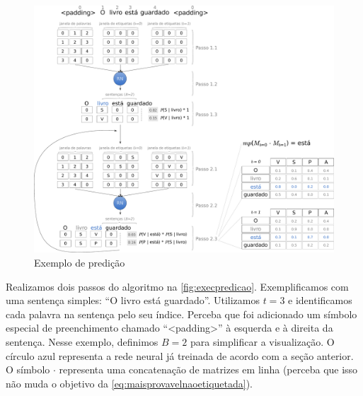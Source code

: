 \begin{figure}[!htb]
    \caption{Exemplo de predição}\label{fig:execpredicao}
    \begin{center}
        \includegraphics[scale=0.25]{img/algoritmodepredicao.pdf}
    \end{center}
\end{figure}

Realizamos dois passos do algoritmo na \autoref{fig:execpredicao}. Exemplificamos com uma sentença simples: ``O livro está guardado''. Utilizamos $t = 3$ e identificamos cada palavra na sentença pelo seu índice. Perceba que foi adicionado um símbolo especial de preenchimento chamado ``<padding>'' à esquerda e à direita da sentença. Nesse exemplo, definimos $B = 2$ para simplificar a visualização. O círculo azul representa a rede neural já treinada de acordo com a seção anterior. O símbolo $\cdot$ representa uma concatenação de matrizes em linha (perceba que isso não muda o objetivo da \autoref{eq:maisprovavelnaoetiquetada}).

